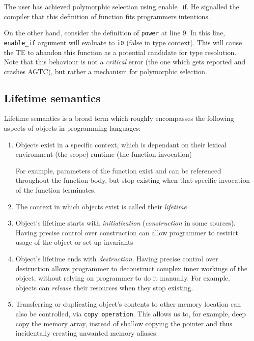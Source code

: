 \documentclass[times, utf8, diplomski]{fer}
\theoremstyle{definition}
\begin{document}
The user has achieved polymorphic selection using enable\_if. He signalled the compiler that this
definition of  function fits programmers intentions.

On the other hand, consider the definition of \texttt{power} at line 9.
In this line, \texttt{enable\_if} argument will evaluate to \texttt{i0} (false in type context).
This will cause the TE to abandon this function as a potential candidate for type resolution.
Note that this behaviour is not a \textit{critical} error (the one which gets reported and crashes AGTC),
but rather a mechanism for polymorphic selection.

\subsection{Lifetime semantics}

Lifetime semantics is a broad term which roughly encompasses the following aspects of objects
in programming languages:

\begin{enumerate}
    \item Objects exist in a specific context, which is dependant on their 
        \subitem lexical environment (the scope)
        \subitem runtime (the function invocation)

        For example, parameters of the function exist and can be referenced throughout the function body,
        but stop existing when that specific invocation of the function terminates. 

    \item The context in which objects exist is called their \textit{lifetime}
    \item Object's lifetime starts with \textit{initialization} (\textit{construction} in some sources).
        \subitem Having precise control over construction can allow programmer
                to restrict usage of the object or set up invariants
    \item Object's lifetime ends with \textit{destruction}.
        Having precise control over destruction allows programmer to
        deconstruct complex inner workings of the object, without relying on programmer to do it manually.
        For example, objects can \textit{release} their resources when they stop existing.
    \item Transferring or duplicating object's contents to other memory location can also be controlled,
        via \texttt{copy operation}. This allows us to, for example, deep copy the memory array, 
        instead of shallow copying the pointer and thus incidentally creating unwanted memory aliases.
\end{enumerate}
\end{document}
